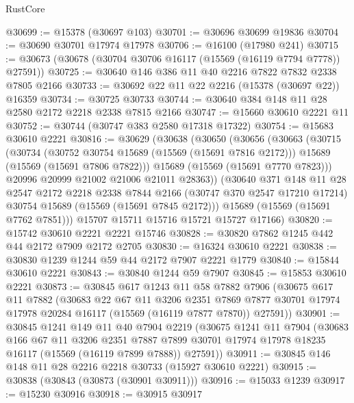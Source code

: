 \begin{lexlean}{RustCore}
\begin{coremodule}
@30699 := @15378 (@30697 @103)
@30701 := @30696 @30699 @19836
@30704 := @30690 @30701 @17974 @17978
@30706 := @16100 (@17980 @241)
@30715 := @30673 (@30678 (@30704 @30706 @16117 (@15569 (@16119 @7794 @7778)) @27591))
@30725 := @30640 @146 @386 @11 @40 @2216 @7822 @7832 @2338 @7805 @2166
@30733 := @30692 @22 @11 @22 @2216 (@15378 (@30697 @22)) @16359
@30734 := @30725 @30733
@30744 := @30640 @384 @148 @11 @28 @2580 @2172 @2218 @2338 @7815 @2166
@30747 := @15660 @30610 @2221 @11
@30752 := @30744 (@30747 @383 @2580 @17318 @17322)
@30754 := @15683 @30610 @2221
@30816 := @30629
    (@30638
      (@30650
        (@30656
          (@30663
            (@30715
              (@30734
                (@30752 @30754 @15689 (@15569 (@15691 @7816 @2172)))
                @15689
                (@15569 (@15691 @7806 @7822)))
              @15689
              (@15569 (@15691 @7770 @7823)))
            @20996
            @20999
            @21002
            @21006
            @21011
            @28363))
        (@30640
          @371
          @148
          @11
          @28
          @2547
          @2172
          @2218
          @2338
          @7844
          @2166
          (@30747 @370 @2547 @17210 @17214)
          @30754
          @15689
          (@15569 (@15691 @7845 @2172)))
        @15689
        (@15569 (@15691 @7762 @7851)))
      @15707
      @15711
      @15716
      @15721
      @15727
      @17166)
@30820 := @15742 @30610 @2221 @2221 @15746
@30828 := @30820 @7862 @1245 @442 @44 @2172 @7909 @2172 @2705
@30830 := @16324 @30610 @2221
@30838 := @30830 @1239 @1244 @59 @44 @2172 @7907 @2221 @1779
@30840 := @15844 @30610 @2221
@30843 := @30840 @1244 @59 @7907
@30845 := @15853 @30610 @2221
@30873 := @30845
    @617
    @1243
    @11
    @58
    @7882
    @7906
    (@30675
      @617
      @11
      @7882
      (@30683
        @22
        @67
        @11
        @3206
        @2351
        @7869
        @7877
        @30701
        @17974
        @17978
        @20284
        @16117
        (@15569 (@16119 @7877 @7870))
        @27591))
@30901 := @30845
    @1241
    @149
    @11
    @40
    @7904
    @2219
    (@30675
      @1241
      @11
      @7904
      (@30683
        @166
        @67
        @11
        @3206
        @2351
        @7887
        @7899
        @30701
        @17974
        @17978
        @18235
        @16117
        (@15569 (@16119 @7899 @7888))
        @27591))
@30911 := @30845 @146 @148 @11 @28 @2216 @2218 @30733 (@15927 @30610 @2221)
@30915 := @30838 (@30843 (@30873 (@30901 @30911)))
@30916 := @15033 @1239
@30917 := @15230 @30916
@30918 := @30915 @30917

\end{coremodule}
\end{lexlean}
